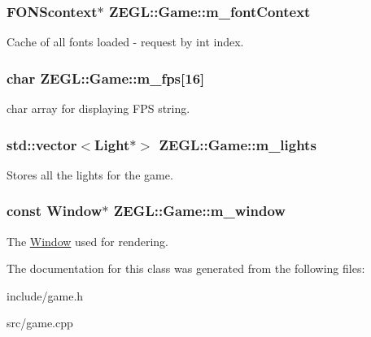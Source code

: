 \subsubsection[{m\+\_\+font\+Context}]{\setlength{\rightskip}{0pt plus 5cm}F\+O\+N\+Scontext$\ast$ Z\+E\+G\+L\+::\+Game\+::m\+\_\+font\+Context\hspace{0.3cm}{\ttfamily [protected]}}\label{class_z_e_g_l_1_1_game_ab7239deb1a14053ae2d757994f2211d0}
Cache of all fonts loaded -\/ request by int index. \hypertarget{class_z_e_g_l_1_1_game_ab290dd46ec4ff766bd56d0e3013bace1}{}
\subsubsection[{m\+\_\+fps}]{\setlength{\rightskip}{0pt plus 5cm}char Z\+E\+G\+L\+::\+Game\+::m\+\_\+fps\mbox{[}16\mbox{]}\hspace{0.3cm}{\ttfamily [protected]}}\label{class_z_e_g_l_1_1_game_ab290dd46ec4ff766bd56d0e3013bace1}
char array for displaying F\+P\+S string. \hypertarget{class_z_e_g_l_1_1_game_ab301928901efd034fe40d53cdb54caf5}{}
\subsubsection[{m\+\_\+lights}]{\setlength{\rightskip}{0pt plus 5cm}std\+::vector$<${\bf Light}$\ast$$>$ Z\+E\+G\+L\+::\+Game\+::m\+\_\+lights\hspace{0.3cm}{\ttfamily [protected]}}\label{class_z_e_g_l_1_1_game_ab301928901efd034fe40d53cdb54caf5}
Stores all the lights for the game. \hypertarget{class_z_e_g_l_1_1_game_a72107b2460cfd896337dab847801fc1c}{}
\subsubsection[{m\+\_\+window}]{\setlength{\rightskip}{0pt plus 5cm}const {\bf Window}$\ast$ Z\+E\+G\+L\+::\+Game\+::m\+\_\+window\hspace{0.3cm}{\ttfamily [protected]}}\label{class_z_e_g_l_1_1_game_a72107b2460cfd896337dab847801fc1c}
The \hyperlink{class_z_e_g_l_1_1_window}{Window} used for rendering. 

The documentation for this class was generated from the following files\+:\begin{DoxyCompactItemize}
\item 
include/game.\+h\item 
src/game.\+cpp\end{DoxyCompactItemize}
